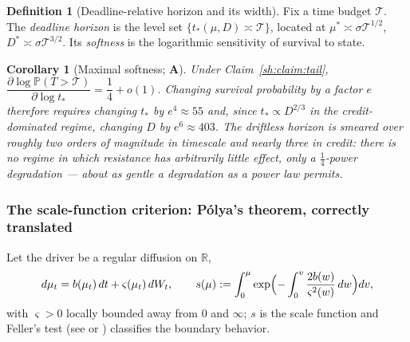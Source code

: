 \documentclass[11pt]{article}
\numberwithin{equation}{section}
\theoremstyle{plain}
\newtheorem{corollary}[theorem]{Corollary}
\theoremstyle{definition}
\newtheorem{definition}[theorem]{Definition}
\theoremstyle{remark}
\newcommand{\PP}{\mathbb{P}}
\newcommand{\R}{\mathbb{R}}
\begin{document}
\begin{definition}[Deadline-relative horizon and its width]
\label{sh:def:deadline}
Fix a time budget $\mathcal T$. The \emph{deadline horizon} is the level
set $\{t_*(\mu,D)\asymp\mathcal T\}$, located at
$\mu^*\asymp\sigma\mathcal T^{1/2}$, $D^*\asymp\sigma\mathcal T^{3/2}$.
Its \emph{softness} is the logarithmic sensitivity of survival to state.
\end{definition}

\begin{corollary}[Maximal softness; \textbf{A}]\label{sh:cor:soft}
Under Claim~\ref{sh:claim:tail},
$\dfrac{\partial\log\PP(T>\mathcal T)}{\partial\log t_*}=\dfrac14+o(1)$.
Changing survival probability by a factor $e$ therefore requires changing
$t_*$ by $e^4\approx55$ and, since $t_*\propto D^{2/3}$ in the
credit-dominated regime, changing $D$ by $e^6\approx403$. The driftless
horizon is smeared over roughly two orders of magnitude in timescale and
nearly three in credit: there is no regime in which resistance has
arbitrarily little effect, only a $\tfrac14$-power degradation --- about as
gentle a degradation as a power law permits.
\end{corollary}

\subsubsection{The scale-function criterion: P\'olya's theorem, correctly
translated}\label{sh:subsub:scale}

Let the driver be a regular diffusion on $\R$,
\begin{equation}\label{sh:eq:generaldriver}
d\mu_t=b(\mu_t)\,dt+\varsigma(\mu_t)\,dW_t,\qquad
s(\mu):=\int_{0}^{\mu}\exp\Bigl(-\int_{0}^{v}\frac{2b(w)}{\varsigma^2(w)}
\,dw\Bigr)dv,
\end{equation}
with $\varsigma>0$ locally bounded away from $0$ and $\infty$; $s$ is the
scale function and Feller's test (see \cite[Ch.~15]{KT81} or
\cite[Ch.~VII]{RY99}) classifies the boundary behavior.
\end{document}

